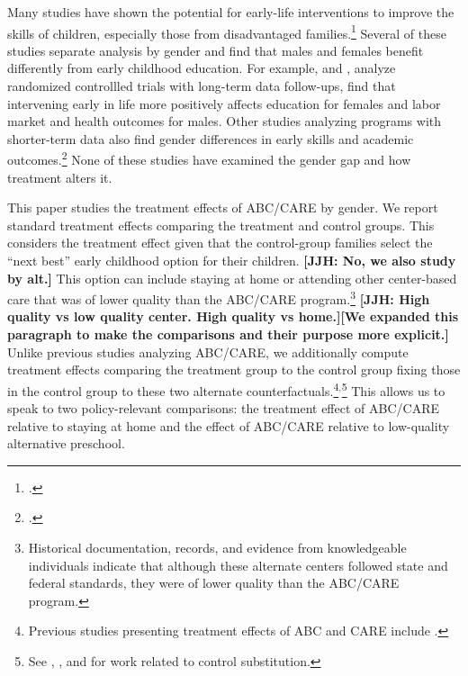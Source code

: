 Many studies have shown the potential for early-life interventions to improve the skills of children, especially those from disadvantaged families.\footnote{\citet{Currie_2011_AER,Elango_Hojman_etal_2016_Early-Edu}.} Several of these studies separate analysis by gender and find that males and females benefit differently from early childhood education. For example, \citet{Heckman_Moon_etal_2010_QE} and \citet{Garcia_Heckman_Leaf_etal_2017_Comp_CBA_Unpublished}, analyze randomized controllled trials with long-term data follow-ups, find that intervening early in life more positively affects education for females and labor market and health outcomes for males. Other studies analyzing programs with shorter-term data also find gender differences in early skills and academic outcomes.\footnote{\citet{Deming_2009_AEJAE,Ou_Reynolds_2010_Mechanisms_CYSR,Magnuson_Kelchen_Duncan_etal_2016_ECRQ}.} None of these studies have examined the gender gap and how treatment alters it.

This paper studies the treatment effects of ABC/CARE by gender. We report standard treatment effects comparing the treatment and control groups. This considers the treatment effect given that the control-group families select the ``next best'' early childhood option for their children. \textbf{[JJH: No, we also study by alt.]} This option can include staying at home or attending other center-based care that was of lower quality than the ABC/CARE program.\footnote{Historical documentation, records, and evidence from knowledgeable individuals indicate that although these alternate centers followed state and federal standards, they were of lower quality than the ABC/CARE program.} \textbf{[JJH: High quality vs low quality center. High quality vs home.][We expanded this paragraph to make the comparisons and their purpose more explicit.]} Unlike previous studies analyzing ABC/CARE, we additionally compute treatment effects comparing the treatment group to the control group fixing those in the control group to these two alternate counterfactuals.\footnote{Previous studies presenting treatment effects of ABC and CARE include \citet{Ramey_etal_1985_Project-CARE_TiECSE, Clarke_Campbell_1998_ABC_Comparison_ECRQ,Campbell_Pungello_etal_2001_DP,Campbell_Ramey_etal_2002_ADS,Campbell_Wasik_etal_2008_ECRQ,Campbell_Conti_etal_2014_EarlyChildhoodInvestments}.}$^,$\footnote{See \cite{Heckman_1992_randomization}, \cite{Heckman_Hohmann_etal_2000_QJE}, and \cite{Kline_Walters_2016_QJE} for work related to control substitution.} This allows us to speak to two policy-relevant comparisons: the treatment effect of ABC/CARE relative to staying at home and the effect of ABC/CARE relative to low-quality alternative preschool. 

